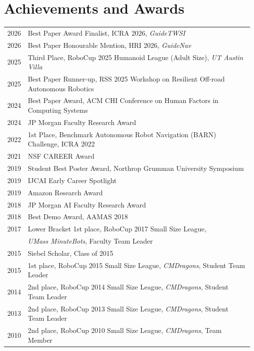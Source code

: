 \documentclass[Times]{article}
\begin{document}
\section*{Achievements and Awards}
\begin{tabular}{ p{1.2cm} l }
  2026  & Best Paper Award Finalist, ICRA 2026, \emph{GuideTWSI} \\
  2026  & Best Paper Honourable Mention, HRI 2026, \emph{GuideNav} \\
  2025  & Third Place, RoboCup 2025 Humanoid League (Adult Size),
      \emph{UT Austin Villa}\\
  2025  & Best Paper Runner-up, RSS 2025 Workshop on Resilient Off-road Autonomous Robotics  \\
  2024  & Best Paper Award, ACM CHI Conference on Human Factors in Computing Systems  \\
  2024  & JP Morgan Faculty Research Award \\
  2022  & 1st Place, Benchmark Autonomous Robot Navigation (BARN) Challenge,
          ICRA 2022 \\
  2021  & NSF CAREER Award\\
  2019  & Student Best Poster Award, Northrop Grumman University Symposium \\
  2019  & IJCAI Early Career Spotlight \\
  2019  & Amazon Research Award \\
  2018  & JP Morgan AI Faculty Research Award \\
  2018  & Best Demo Award, AAMAS 2018 \\
  2017  & Lower Bracket 1st place, RoboCup 2017 Small Size League, \\
      &\emph{UMass MinuteBots}, Faculty Team Leader\\
  2015  & Siebel Scholar, Class of 2015 \\
  2015  & 1st place, RoboCup 2015 Small Size League,
     \emph{CMDragons}, Student Team Leader\\
  2014  & 2nd place, RoboCup 2014 Small Size League,
     \emph{CMDragons}, Student Team Leader\\
  2013  & 2nd place, RoboCup 2013 Small Size League,
     \emph{CMDragons}, Student Team Leader\\
  2010  & 2nd place, RoboCup 2010 Small Size League,
     \emph{CMDragons}, Team Member\\
\end{tabular}
\end{document}
